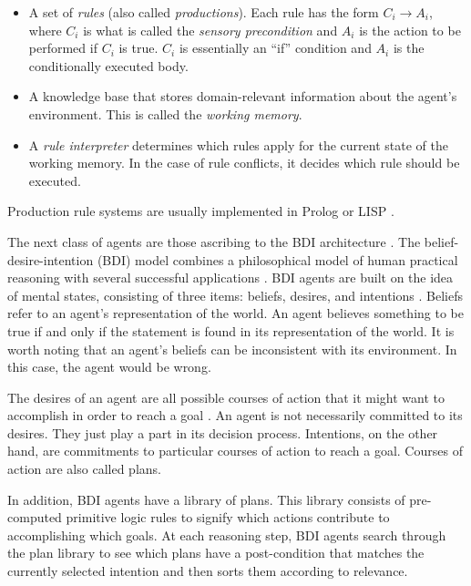 \begin{itemize}

    \item A set of \textit{rules} (also called \textit{productions}).
        Each rule has the form $ C_i \rightarrow A_i $,
        where $ C_i $ is what is called the \textit{sensory precondition}
        and $ A_i $ is the action to be performed if $ C_i $ is true.
        $ C_i $ is essentially an ``if'' condition and $ A_i $ is the conditionally executed body.

    \item A knowledge base that stores domain-relevant information about the agent's environment.
        This is called the \textit{working memory}.

    \item A \textit{rule interpreter} determines which rules apply for the current state of the working memory.
        In the case of rule conflicts, it decides which rule should be executed.

\end{itemize}


Production rule systems are usually implemented in Prolog or LISP \cite{balke_how_2014}.

The next class of agents are those ascribing to the BDI architecture \cite{balke_how_2014}.
The belief-desire-intention (BDI) model combines a philosophical model of human practical reasoning
with several successful applications \cite{georgeff_belief-desire-intention_1999}.
BDI agents are built on the idea of mental states,
consisting of three items: beliefs, desires, and intentions \cite{balke_how_2014}.
Beliefs refer to an agent's representation of the world.
An agent believes something to be true if and only if the statement is found in its representation of the world.
It is worth noting that an agent's beliefs can be inconsistent with its environment.
In this case, the agent would be wrong.

\cite{rao_modeling_1991}

The desires of an agent are all possible courses of action that it might want to accomplish in order to reach a goal \cite{balke_how_2014}.
An agent is not necessarily committed to its desires.
They just play a part in its decision process.
Intentions, on the other hand, are commitments to particular courses of action to reach a goal.
Courses of action are also called plans.

In addition, BDI agents have a library of plans.
This library consists of pre-computed primitive logic rules to signify which actions contribute to accomplishing which goals.
At each reasoning step, BDI agents search through the plan library to see which plans have a post-condition that matches the currently selected intention
and then sorts them according to relevance.


